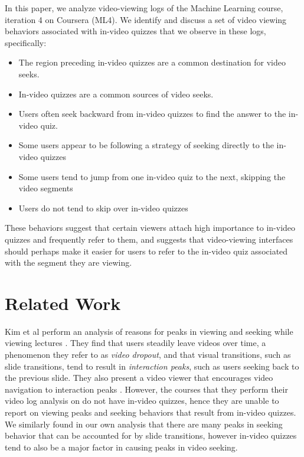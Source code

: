 \documentclass{sigchi}
\begin{document}
In this paper, we analyze video-viewing logs of the Machine Learning course, iteration 4 on Coursera (ML4). We identify and discuss a set of video viewing behaviors associated with in-video quizzes that we observe in these logs, specifically:

\begin{itemize}
\item The region preceding in-video quizzes are a common destination for video seeks.
\item In-video quizzes are a common sources of video seeks.
\item Users often seek backward from in-video quizzes to find the answer to the in-video quiz.
\item Some users appear to be following a strategy of seeking directly to the in-video quizzes
\item Some users tend to jump from one in-video quiz to the next, skipping the video segments
\item Users do not tend to skip over in-video quizzes
\end{itemize}

These behaviors suggest that certain viewers attach high importance to in-video quizzes and frequently refer to them, and suggests that video-viewing interfaces should perhaps make it easier for users to refer to the in-video quiz associated with the segment they are viewing.

\newpage

\section{Related Work}

Kim et al perform an analysis of reasons for peaks in viewing and seeking while viewing lectures \cite{juho}. They find that users steadily leave videos over time, a phenomenon they refer to as \emph{video dropout}, and that visual transitions, such as slide transitions, tend to result in \emph{interaction peaks}, such as users seeking back to the previous slide. They also present a video viewer that encourages video navigation to interaction peaks  \cite{juho2}. However, the courses that they perform their video log analysis on do not have in-video quizzes, hence they are unable to report on viewing peaks and seeking behaviors that result from in-video quizzes. We similarly found in our own analysis that there are many peaks in seeking behavior that can be accounted for by slide transitions, however in-video quizzes tend to also be a major factor in causing peaks in video seeking.
\end{document}
